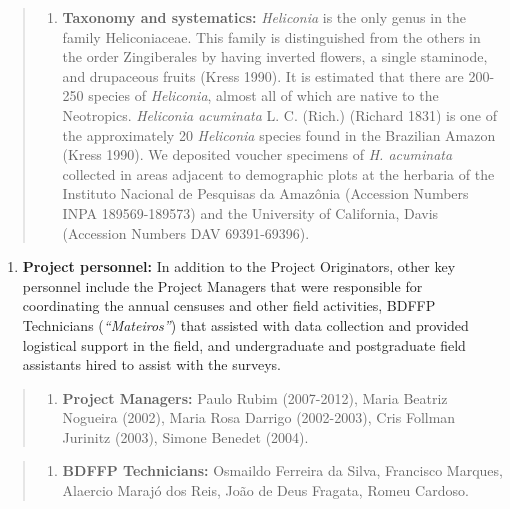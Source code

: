 \documentclass[
  12pt,
  man, donotrepeattitle,floatsintext]{apa6}
\providecommand{\tightlist}{%
  \setlength{\itemsep}{0pt}\setlength{\parskip}{0pt}}
\begin{document}
\begin{quote}
\begin{enumerate}
\def\labelenumi{\alph{enumi}.}
\setcounter{enumi}{1}
\tightlist
\item
  \textbf{Taxonomy and systematics:} \emph{Heliconia} is the only genus in the family Heliconiaceae. This family is distinguished from the others in the order Zingiberales by having inverted flowers, a single staminode, and drupaceous fruits (Kress 1990). It is estimated that there are 200-250 species of \emph{Heliconia}, almost all of which are native to the Neotropics. \emph{Heliconia acuminata} L. C. (Rich.) (Richard 1831) is one of the approximately 20 \emph{Heliconia} species found in the Brazilian Amazon (Kress 1990). We deposited voucher specimens of \emph{H. acuminata} collected in areas adjacent to demographic plots at the herbaria of the Instituto Nacional de Pesquisas da Amazônia (Accession Numbers INPA 189569-189573) and the University of California, Davis (Accession Numbers DAV 69391-69396).
\end{enumerate}
\end{quote}

\begin{enumerate}
\def\labelenumi{\arabic{enumi}.}
\setcounter{enumi}{3}
\tightlist
\item
  \textbf{Project personnel:} In addition to the Project Originators, other key personnel include the Project Managers that were responsible for coordinating the annual censuses and other field activities, BDFFP Technicians (\emph{``Mateiros''}) that assisted with data collection and provided logistical support in the field, and undergraduate and postgraduate field assistants hired to assist with the surveys.
\end{enumerate}

\begin{quote}
\begin{enumerate}
\def\labelenumi{\alph{enumi}.}
\tightlist
\item
  \textbf{Project Managers:} Paulo Rubim (2007-2012), Maria Beatriz Nogueira (2002), Maria Rosa Darrigo (2002-2003), Cris Follman Jurinitz (2003), Simone Benedet (2004).
\end{enumerate}
\end{quote}

\begin{quote}
\begin{enumerate}
\def\labelenumi{\alph{enumi}.}
\setcounter{enumi}{1}
\tightlist
\item
  \textbf{BDFFP Technicians:} Osmaildo Ferreira da Silva, Francisco Marques, Alaercio Marajó dos Reis, João de Deus Fragata, Romeu Cardoso.
\end{enumerate}
\end{quote}
\end{document}

